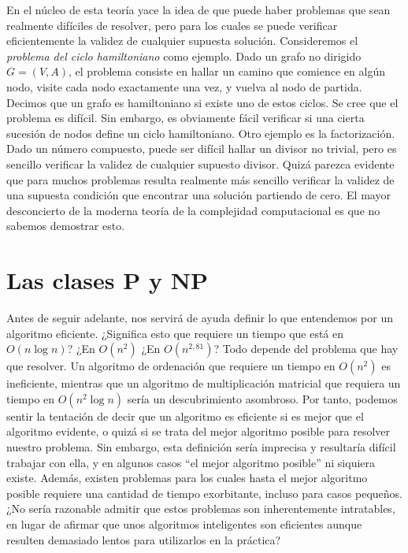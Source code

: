 En el núcleo de esta teoría yace la idea de que puede haber problemas que sean realmente difíciles de resolver, pero para los cuales se puede verificar eficientemente la validez de cualquier supuesta solución. Consideremos el \emph{problema del ciclo hamiltoniano} como ejemplo. Dado un grafo no dirigido $G = (V,A)$, el problema consiste en hallar un camino que comience en algún nodo, visite cada nodo exactamente una vez, y vuelva al nodo de partida. Decimos que un grafo es hamiltoniano si existe uno de estos ciclos. Se cree que el problema es difícil. Sin embargo, es obviamente fácil verificar si una cierta sucesión de nodos define un ciclo hamiltoniano. Otro ejemplo es la factorización. Dado un número compuesto, puede ser difícil hallar un divisor no trivial, pero es sencillo verificar la validez de cualquier supuesto divisor. Quizá parezca evidente que para muchos problemas resulta realmente más sencillo verificar la validez de una supuesta condición que encontrar una solución partiendo de cero. El mayor desconcierto de la moderna teoría de la complejidad computacional es que no sabemos demostrar esto.\\

\section{Las clases P y NP}

Antes de seguir adelante, nos servirá de ayuda definir lo que entendemos por un algoritmo eficiente. ¿Significa esto que requiere un tiempo que está en $O(n \log n)$? ¿En $O(n^2)$ ¿En $O(n^{2,81})$? Todo depende del problema que hay que resolver. Un algoritmo de ordenación que requiere un tiempo en $O(n^2)$ es ineficiente, mientras que un algoritmo de multiplicación matricial que requiera un tiempo en $O(n^2 \log n)$ sería un descubrimiento asombroso. Por tanto, podemos sentir la tentación de decir que un algoritmo es eficiente si es mejor que el algoritmo evidente, o quizá si se trata del mejor algoritmo posible para resolver nuestro problema. Sin embargo, esta definición sería imprecisa y resultaría difícil trabajar con ella, y en algunos casos ``el mejor algoritmo posible'' ni siquiera existe. Además, existen problemas para los cuales hasta el mejor algoritmo posible requiere una cantidad de tiempo exorbitante, incluso para casos pequeños. ¿No sería razonable admitir que estos problemas son inherentemente intratables, en lugar de afirmar que unos algoritmos inteligentes son eficientes aunque resulten demasiado lentos para utilizarlos en la práctica?\\

